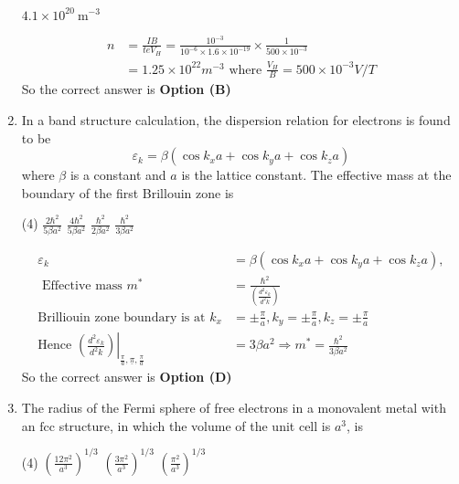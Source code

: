 \begin{enumerate}
\begin{tasks}
\task[\textbf{D.}] $4.1 \times 10^{20} \mathrm{~m}^{-3}$
\end{tasks}
\begin{answer}
\begin{align*}
n&=\frac{I B}{t e V_{H}}=\frac{10^{-3}}{10^{-6} \times 1.6 \times 10^{-19}} \times \frac{1}{500 \times 10^{-3}}\\&=1.25 \times 10^{22} m^{-3}\text{ where }\frac{V_{H}}{B}=500 \times 10^{-3} V / T
\end{align*}
So the correct answer is \textbf{Option (B)}
\end{answer}
	\item In a band structure calculation, the dispersion relation for electrons is found to be
	$$
	\varepsilon_{k}=\beta\left(\cos k_{x} a+\cos k_{y} a+\cos k_{z} a\right)
	$$
	where $\beta$ is a constant and $a$ is the lattice constant. The effective mass at the boundary of the first Brillouin zone is
	{}
\begin{tasks}(4)
\task[\textbf{A.}] $\frac{2 \hbar^{2}}{5 \beta a^{2}}$
\task[\textbf{B.}] $\frac{4 \hbar^{2}}{5 \beta a^{2}}$
\task[\textbf{C.}] $\frac{\hbar^{2}}{2 \beta a^{2}}$
\task[\textbf{D.}] $\frac{\hbar^{2}}{3 \beta a^{2}}$
\end{tasks}
\begin{answer}
\begin{align*}
\varepsilon_{k}&=\beta\left(\cos k_{x} a+\cos k_{y} a+\cos k_{z} a\right),\\\text{ Effective mass }m^{*}&=\frac{\hbar^{2}}{\left(\frac{d^{2} \varepsilon_{k}}{d^{2} k}\right)}\\
\text{Brilliouin zone boundary is at }k_{x}&=\pm \frac{\pi}{a}, k_{y}=\pm \frac{\pi}{a}, k_{z}=\pm \frac{\pi}{a}\\
\text{Hence }\left.\left(\frac{d^{2} \varepsilon_{k}}{d^{2} k}\right)\right|_{\frac{\pi}{a}, \underline{\pi}, \frac{\pi}{a}}&=3 \beta a^{2} \Rightarrow m^{*}=\frac{\hbar^{2}}{3 \beta a^{2}}
\end{align*}
So the correct answer is \textbf{Option (D)}
\end{answer}
	\item The radius of the Fermi sphere of free electrons in a monovalent metal with an $\mathrm{fcc}$ structure, in which the volume of the unit cell is $a^{3}$, is
	{}
\begin{tasks}(4)
\task[\textbf{A.}] $\left(\frac{12 \pi^{2}}{a^{3}}\right)^{1 / 3}$
\task[\textbf{B.}] $\left(\frac{3 \pi^{2}}{a^{3}}\right)^{1 / 3}$
\task[\textbf{C.}] $\left(\frac{\pi^{2}}{a^{3}}\right)^{1 / 3}$

\end{tasks}
\end{enumerate}
